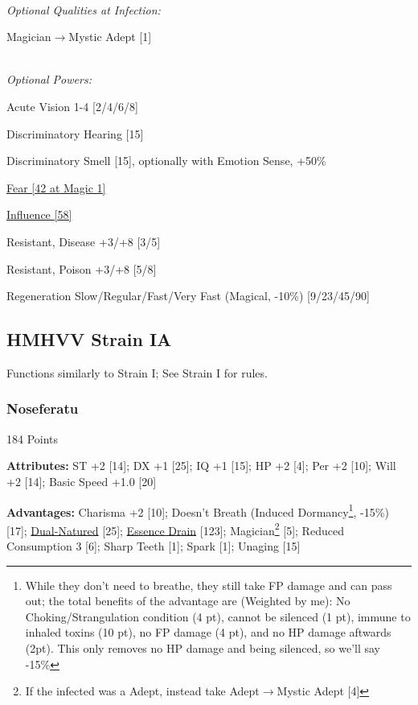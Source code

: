 \begin{multicols*}{3}
	\textit{\\Optional Qualities at Infection:}
	
	Magician$\rightarrow$Mystic Adept [1]
		
	\textit{\\Optional Powers:}
	
	Acute Vision 1-4 [2/4/6/8]
	
	Discriminatory Hearing [15]
	
	Discriminatory Smell [15], optionally with Emotion Sense, +50\%
	
	\hyperref[fear]{Fear [42 at Magic 1]}
	
	\hyperref[influence]{Influence [58]}
		
	Resistant, Disease +3/+8 [3/5]
		
	Resistant, Poison +3/+8 [5/8]
	
	Regeneration Slow/Regular/Fast/Very Fast (Magical, -10\%) [9/23/45/90]
	
	\subsection*{HMHVV Strain IA}
	
	Functions similarly to Strain I; See Strain I for rules.
	
	\subsubsection{Noseferatu}\label{nosferatu}
	\begin{flushright}
		184 Points
	\end{flushright}
	
	\textbf{Attributes:}
	ST +2 [14]; DX +1 [25]; IQ +1 [15]; HP +2 [4]; Per +2 [10]; Will +2 [14]; Basic Speed +1.0 [20]
	
	\textbf{Advantages:}
	Charisma +2 [10]; Doesn't Breath (Induced Dormancy\footnote{While they don't need to breathe, they still take FP damage and can pass out; the total benefits of the advantage are (Weighted by me): No Choking/Strangulation condition (4 pt), cannot be silenced (1 pt), immune to inhaled toxins (10 pt), no FP damage (4 pt), and no HP damage aftwards (2pt). This only removes no HP damage and being silenced, so we'll say -15\%}, -15\%) [17]; \hyperref[dual_natured]{Dual-Natured} [25];  \hyperref[essence_drain]{Essence Drain} [123]; Magician\footnote{If the infected was a Adept, instead take Adept$\rightarrow$Mystic Adept [4]} [5]; Reduced Consumption 3 [6]; Sharp Teeth [1]; Spark [1]; Unaging [15]
	

\end{multicols*}

